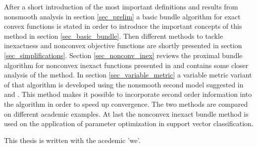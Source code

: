 After a short introduction of the most important definitions and results from nonsmooth analysis in section \ref{sec_prelim} a basic bundle algorithm for exact convex functions is stated in order to introduce the important concepts of this method in section \ref{sec_basic_bundle}. Then different methods to tackle inexactness and nonconvex objective functions are shortly presented in section \ref{sec_simplifications}.
Section \ref{sec_nonconv_inex} reviews the proximal bundle algorithm for nonconvex inexact functions presented in \cite{Hare2016} and contains some closer analysis of the method. In section \ref{sec_variable_metric} a variable metric variant of that algorithm is developed using the nonsmooth second model suggested in \cite{Noll2012} and \cite{Noll2013}.
This method makes it possible to incorporate second order information into the algorithm in order to speed up convergence.
The two methods are compared on different academic examples.
At last the nonconvex inexact bundle method is used on the application of parameter optimization in support vector classification. 

 


This thesis is written with the acedemic 'we'.




